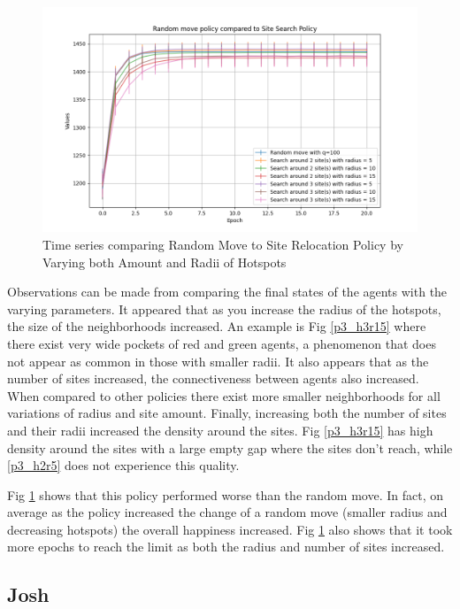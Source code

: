 \documentclass[11pt]{article}
\begin{document}
	\begin{figure}
		\centering
		\includegraphics[width=.5\textwidth]{policies03.png}
		\caption{Time series comparing Random Move to Site Relocation Policy by Varying both Amount and Radii of Hotspots}
		\label{p3_ts}
	\end{figure}
	\FloatBarrier
	Observations can be made from comparing the final states of the agents with the varying parameters. It appeared that as you increase the radius of the hotspots, the size of the neighborhoods increased. An example is Fig \ref{p3_h3r15} where there exist very wide pockets of red and green agents, a phenomenon that does not appear as common in those with smaller radii. It also appears that as the number of sites increased, the connectiveness between agents also increased. When compared to other policies there exist more smaller neighborhoods for all variations of radius and site amount. Finally, increasing both the number of sites and their radii increased the density around the sites. Fig \ref{p3_h3r15} has high density around the sites with a large empty gap where the sites don’t reach, while \ref{p3_h2r5} does not experience this quality.\par
	Fig \ref{p3_ts} shows that this policy performed worse than the random move. In fact, on average as the policy increased the change of a random move (smaller radius and decreasing hotspots) the overall happiness increased. Fig \ref{p3_ts} also shows that it took more epochs to reach the limit as both the radius and number of sites increased. 

	
	\newpage
	
	\subsection{Josh}
	
	


	
\end{document}
